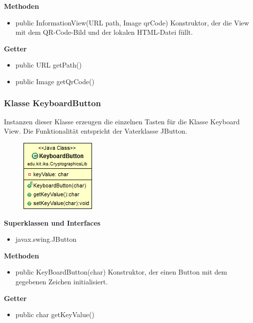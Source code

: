 \documentclass{article}
\begin{document}
      \textbf{Methoden}
      \begin{itemize}
        \item public InformationView(URL path, Image qrCode) \newline
          Konstruktor, der die View mit dem QR-Code-Bild und der lokalen HTML-Datei füllt.
      \end{itemize}
      
      \textbf{Getter}
      \begin{itemize}
		\item public URL getPath()
		\item public Image getQrCode()
      \end{itemize}
	
	\subsubsection{Klasse KeyboardButton}
	  Instanzen dieser Klasse erzeugen die einzelnen Tasten für die Klasse Keyboard View. Die Funktionalität entspricht der Vaterklasse JButton.
	
      \begin{figure}[H]
        \centering
        \includegraphics{resources/edu-kit-iks-CryptographicsLib-KeyboardButton}
      \end{figure}
	
      \textbf{Superklassen und Interfaces}
      \begin{itemize}
        \item javax.swing.JButton
      \end{itemize}
	
      \textbf{Methoden}
      \begin{itemize}
        \item public KeyBoardButton(char) \newline
          Konstruktor, der einen Button mit dem gegebenen Zeichen initialisiert.
      \end{itemize}
      
      \textbf{Getter}
      \begin{itemize}
		\item public char getKeyValue()
      \end{itemize}
      
\end{document}
